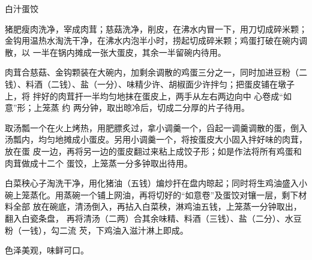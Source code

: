 \begin{recipe}[如意蛋饺]{白汁蛋饺}

\ingredients


\preparation

\step 猪肥瘦肉洗净，宰成肉茸；慈菇洗净，削皮，在沸水内冒一下，用刀切成碎米颗；
金钩用温热水淘洗干净，在沸水内泡半小时，捞起切成碎米颗；鸡蛋打破在碗内调散，以
一半在锅内摊成一张大蛋皮，其余一半留碗内待用。

\step 肉茸合慈菇、金钩颗装在大碗内，加剩余调散的鸡蛋三分之一，同时加进豆粉（二
钱）、料酒（二钱）、盐（一分）、味精少许、胡椒面少许拌匀；把蛋皮铺在墩子上，将
拌好的肉茸扞一半均匀地抹在蛋皮上，两手从左右两边向中 心卷成“如意”形；上笼蒸 约
两分钟，取出晾冷后，切成二分厚的片子待用。

\step 取汤瓢一个在火上烤热，用肥膘炙过，拿小调羹一个，舀起一调羹调散的蛋，倒入
汤瓢内，均匀地摊成小蛋皮。另用小调羹一个，将按蛋皮大小固入拌好味的肉茸，放在蛋
皮一边，再将另一边的蛋皮翻过来粘上成饺子形；如是作法将所有鸡蛋和肉茸做成十二个
蛋饺，上笼蒸一分多钟取出待用。

\step 白菜秧心子淘洗干净，用化猪油（五钱）煸炒扞在盘内晾起；同时将生鸡油盛入小
碗上笼蒸化。用蒸碗一个铺上网油，再将切好的“如意卷”及蛋饺对镶一层，剩下材料全部
放在碗底，清汤倒入，再拈入白菜秧，淋鸡油五钱，上笼蒸一分钟取出，翻入白瓷条盘，
再将清汤（二两）合其余味精、料酒（三钱）、盐（二分）、水豆粉（一钱），勾二流
芡，下鸡油入滋汁淋上即成。

\features

色泽美观，味鲜可口。

\end{recipe}

